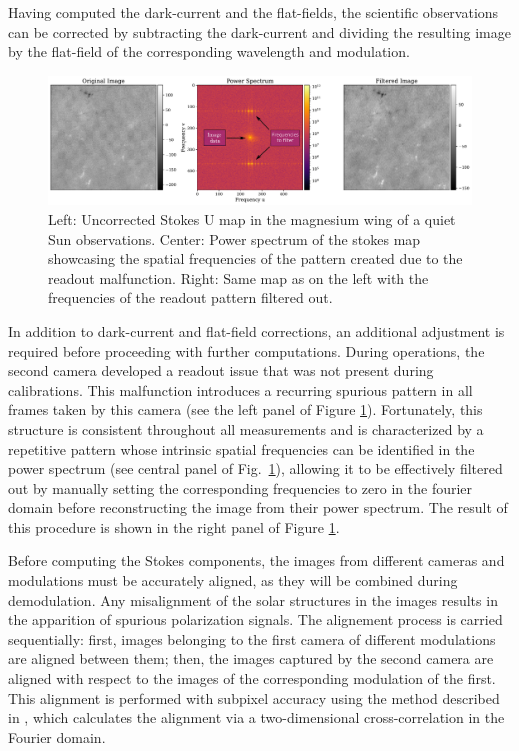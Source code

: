 Having computed the dark-current and the flat-fields, the scientific observations can be corrected by subtracting the dark-current and dividing the resulting image by the flat-field of the corresponding wavelength and modulation. 

\begin{figure}
  \includegraphics[width=\textwidth]{figures/Pipeline/readout_problem.pdf}
  \caption[Readout pattern filtering]{Left: Uncorrected Stokes U map in the magnesium wing of a quiet Sun observations. Center: Power spectrum of the stokes map showcasing the spatial frequencies of the pattern created due to the readout malfunction. Right: Same map as on the left with the frequencies of the readout pattern filtered out.}
    \label{fig_pipeline: readout}
\end{figure}

In addition to dark-current and flat-field corrections, an additional adjustment is required before proceeding with further computations. During operations, the second camera developed a readout issue that was not present during calibrations. This malfunction introduces a recurring spurious pattern in all frames taken by this camera (see the left panel of Figure \ref{fig_pipeline: readout}). Fortunately, this structure is consistent throughout all measurements and is characterized by a repetitive pattern whose intrinsic spatial frequencies can be identified in the power spectrum (see central panel of Fig.~\ref{fig_pipeline: readout}), allowing it to be effectively filtered out by manually setting the corresponding frequencies to zero in the fourier domain before reconstructing the image from their power spectrum. The result of this procedure is shown in the right panel of Figure \ref{fig_pipeline: readout}.  

Before computing the Stokes components, the images from different cameras and modulations must be accurately aligned, as they will be combined during demodulation. Any misalignment of the solar structures in the images results in the apparition of spurious polarization signals. The alignement process is carried sequentially: first, images belonging to the first camera of different modulations are aligned between them; then, the images captured by the second camera are aligned with respect to the images of the corresponding modulation of the first. This alignment is performed with subpixel accuracy using the method described in \cite{alineamiento}, which calculates the alignment via a two-dimensional cross-correlation in the Fourier domain.

